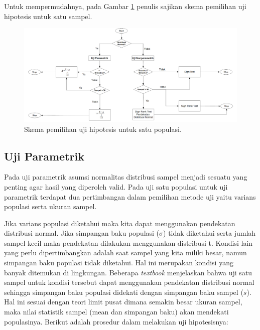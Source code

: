\documentclass[]{book}
\begin{document}
Untuk mempermudahnya, pada Gambar \ref{fig:singletest} penulis sajikan
skema pemilihan uji hipotesis untuk satu sampel.

\newpage

\begin{landscape}
\begin{figure}

{\centering \includegraphics[width=0.9\linewidth]{singletest} 

}

\caption{Skema pemilihan uji hipotesis untuk satu populasi.}\label{fig:singletest}
\end{figure}
\end{landscape}

\subsection{Uji Parametrik}\label{uji-parametrik}

Pada uji parametrik asumsi normalitas distribusi sampel menjadi sesuatu
yang penting agar hasil yang diperoleh valid. Pada uji satu populasi
untuk uji parametrik terdapat dua pertimbangan dalam pemilihan metode
uji yaitu varians populasi serta ukuran sampel.

Jika varians populasi diketahui maka kita dapat menggunakan pendekatan
distribusi normal. Jika simpangan baku populasi (\(\sigma\)) tidak
diketahui serta jumlah sampel kecil maka pendekatan dilakukan
menggunakan distribusi t. Kondisi lain yang perlu dipertimbangkan adalah
saat sampel yang kita miliki besar, namun simpangan baku populasi tidak
diketahui. Hal ini merupakan kondisi yang banyak ditemukan di
lingkungan. Beberapa \emph{textbook} menjelaskan bahwa uji satu sampel
untuk kondisi tersebut dapat menggunakan pendekatan distribusi normal
sehingga simpangan baku populasi didekati dengan simpangan baku sampel
(\(s\)). Hal ini sesuai dengan teori limit pusat dimana semakin besar
ukuran sampel, maka nilai statistik sampel (mean dan simpangan baku)
akan mendekati populasinya. Berikut adalah prosedur dalam melakukan uji
hipotesisnya:
\end{document}

